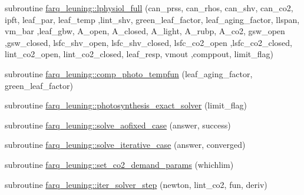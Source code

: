\begin{DoxyCompactItemize}
\item 
subroutine \hyperlink{namespacefarq__leuning_a93499fd595f405b9df3bf88c5be1569e}{farq\+\_\+leuning\+::lphysiol\+\_\+full} (can\+\_\+prss, can\+\_\+rhos, can\+\_\+shv, can\+\_\+co2, ipft, leaf\+\_\+par, leaf\+\_\+temp                                                                                                                           ,lint\+\_\+shv, green\+\_\+leaf\+\_\+factor, leaf\+\_\+aging\+\_\+factor, llspan, vm\+\_\+bar                                                                                                                       ,leaf\+\_\+gbw, A\+\_\+open, A\+\_\+closed, A\+\_\+light, A\+\_\+rubp, A\+\_\+co2, gsw\+\_\+open                                                                                                                                       ,gsw\+\_\+closed, lsfc\+\_\+shv\+\_\+open, lsfc\+\_\+shv\+\_\+closed, lsfc\+\_\+co2\+\_\+open                                                                                                                                       ,lsfc\+\_\+co2\+\_\+closed, lint\+\_\+co2\+\_\+open, lint\+\_\+co2\+\_\+closed, leaf\+\_\+resp, vmout                                                                                                           ,comppout, limit\+\_\+flag)
\item 
subroutine \hyperlink{namespacefarq__leuning_a9b3b89dd90573241f7a95685e0c416f6}{farq\+\_\+leuning\+::comp\+\_\+photo\+\_\+tempfun} (leaf\+\_\+aging\+\_\+factor, green\+\_\+leaf\+\_\+factor)
\item 
subroutine \hyperlink{namespacefarq__leuning_a874ab59c974d12da5a8ea01c48dd089c}{farq\+\_\+leuning\+::photosynthesis\+\_\+exact\+\_\+solver} (limit\+\_\+flag)
\item 
subroutine \hyperlink{namespacefarq__leuning_a8dbd2dbff6eba13ef68535d94a06a569}{farq\+\_\+leuning\+::solve\+\_\+aofixed\+\_\+case} (answer, success)
\item 
subroutine \hyperlink{namespacefarq__leuning_a88f53f468e321e185e87a1fa9f890116}{farq\+\_\+leuning\+::solve\+\_\+iterative\+\_\+case} (answer, converged)
\item 
subroutine \hyperlink{namespacefarq__leuning_a7a8d111e1aa61a24fdbd7e96f67967e0}{farq\+\_\+leuning\+::set\+\_\+co2\+\_\+demand\+\_\+params} (whichlim)
\item 
subroutine \hyperlink{namespacefarq__leuning_a0aaa5d6b54e5a9a9549d2c43bfbecf06}{farq\+\_\+leuning\+::iter\+\_\+solver\+\_\+step} (newton, lint\+\_\+co2, fun, deriv)

\end{DoxyCompactItemize}
